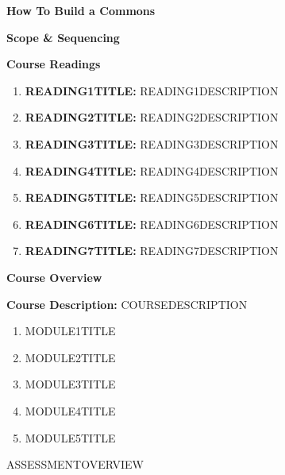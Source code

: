 \documentclass{article}
\begin{document}
	
{\huge \textbf{How To Build a Commons}}

\vspace{1cm}

{\Large \textbf{Scope \& Sequencing}}

\vspace{1cm}

{\huge \textbf{Course Readings}}

\begin{enumerate}
	
	\item \textbf{READING1TITLE:} READING1DESCRIPTION
	
	\item \textbf{READING2TITLE:} READING2DESCRIPTION
	
	\item \textbf{READING3TITLE:} READING3DESCRIPTION
	
	\item \textbf{READING4TITLE:} READING4DESCRIPTION
	
	\item \textbf{READING5TITLE:} READING5DESCRIPTION
	
	\item \textbf{READING6TITLE:} READING6DESCRIPTION
	
	\item \textbf{READING7TITLE:} READING7DESCRIPTION
	
\end{enumerate}

\pagebreak

{\huge \textbf{Course Overview}}
\vspace{1cm}

\textbf{Course Description:} COURSEDESCRIPTION

\begin{enumerate}
\item MODULE1TITLE

\item MODULE2TITLE

\item MODULE3TITLE

\item MODULE4TITLE

\item MODULE5TITLE
\end{enumerate}

ASSESSMENTOVERVIEW
\end{document}
